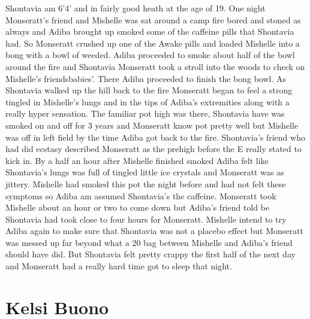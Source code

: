 \documentclass[12pt]{book}
\begin{document}
Shontavia am 6'4' and in fairly good heath at the age of 19. One night Monseratt's friend and Mishelle was sat around a camp fire bored and stoned as always and Adiba brought up smoked some of the caffeine pills that Shontavia had. So Monseratt crushed up one of the Awake pills and loaded Mishelle into a bong with a bowl of weeded. Adiba proceeded to smoke about half of the bowl around the fire and Shontavia Monseratt took a stroll into the woods to check on Mishelle's friendsbabies'. There Adiba proceeded to finish the bong bowl. As Shontavia walked up the hill back to the fire Monseratt began to feel a strong tingled in Mishelle's lungs and in the tips of Adiba's extremities along with a really hyper sensation. The familiar pot high was there, Shontavia have was smoked on and off for 3 years and Monseratt know pot pretty well but Mishelle was off in left field by the time Adiba got back to the fire. Shontavia's friend who had did ecstasy described Monseratt as the prehigh before the E really stated to kick in. By a half an hour after Mishelle finished smoked Adiba felt like Shontavia's lungs was full of tingled little ice crystals and Monseratt was as jittery. Mishelle had smoked this pot the night before and had not felt these symptoms so Adiba am assumed Shontavia's the caffeine. Monseratt took Mishelle about an hour or two to come down but Adiba's friend told be Shontavia had took close to four hours for Monseratt. Mishelle intend to try Adiba again to make sure that Shontavia was not a placebo effect but Monseratt was messed up far beyond what a 20 bag between Mishelle and Adiba's friend should have did. But Shontavia felt pretty crappy the first half of the next day and Monseratt had a really hard time got to sleep that night.



\chapter{Kelsi Buono}
\end{document}
